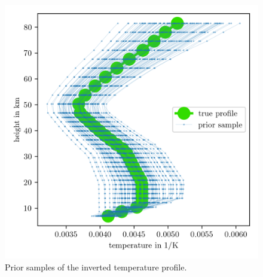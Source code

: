\begin{figure}[ht!]
	\centering
	\includegraphics{PriorOverTempPost.png}
	\caption[Prior samples of $1/\bm{T}$]{Prior samples of the inverted temperature profile.}
	\label{fig:OverTempPrior}
\end{figure}
\clearpage

